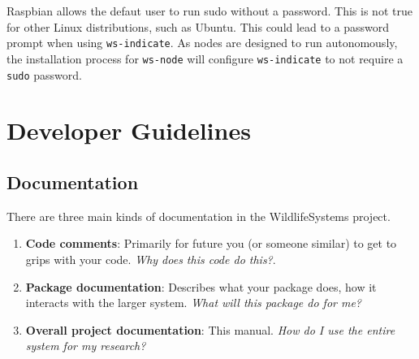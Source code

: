 \documentclass[
]{book}
\begin{document}
Raspbian allows the defaut user to run sudo without a password. This is not true for other Linux distributions, such as Ubuntu. This could lead to a password prompt when using \texttt{ws-indicate}. As nodes are designed to run autonomously, the installation process for \texttt{ws-node} will configure \texttt{ws-indicate} to not require a \texttt{sudo} password.

\hypertarget{developer-guidelines}{%
\chapter{Developer Guidelines}\label{developer-guidelines}}

\hypertarget{documentation}{%
\section{Documentation}\label{documentation}}

There are three main kinds of documentation in the WildlifeSystems project.

\begin{enumerate}
\def\labelenumi{\arabic{enumi}.}
\item
  \textbf{Code comments}: Primarily for future you (or someone similar) to get to grips with your code. \emph{Why does this code do this?}.
\item
  \textbf{Package documentation}: Describes what your package does, how it interacts with the larger system. \emph{What will this package do for me?}
\item
  \textbf{Overall project documentation}: This manual. \emph{How do I use the entire system for my research?}
\end{enumerate}

  
\end{document}
